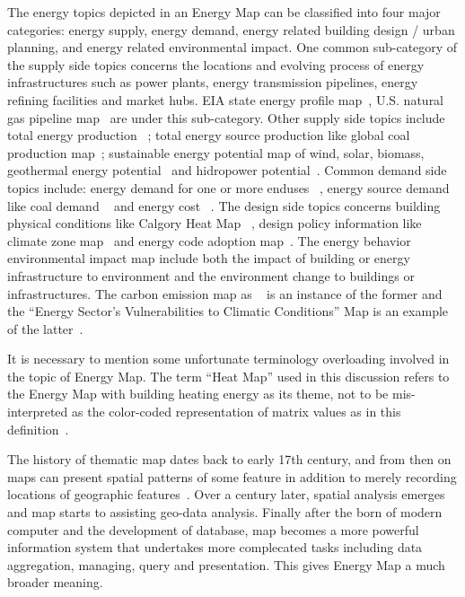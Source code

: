\documentclass[hidelinks,12pt]{article}
\begin{document}
The energy topics depicted in an Energy Map can be classified into
four major categories: energy supply, energy demand, energy related
building design / urban planning, and energy related environmental
impact. One common sub-category of the supply side topics concerns the
locations and evolving process of energy infrastructures such as power
plants, energy transmission pipelines, energy refining facilities and
market hubs. EIA state energy profile map~\cite{EIAProfile2015},
U.S. natural gas pipeline map~\cite{EIAGaspipe} are under this
sub-category. Other supply side topics include total energy production
~\cite{DOEEnergyProduct}; total energy source production like global
coal production map~\cite{EIACoalProduct}; sustainable energy
potential map of wind, solar, biomass, geothermal energy
potential~\cite{NRELMap2015} and hidropower
potential~\cite{DOEHydro}. Common demand side topics include: energy
demand for one or more enduses ~\cite{heatMap2012}, energy source
demand like coal demand ~\cite{EIACoalDemand} and energy cost
~\cite{DOEEnergyCost}. The design side topics concerns building
physical conditions like Calgory Heat Map ~\cite{Hay2011}, design
policy information like climate zone map~\cite{IECCClimate} and energy
code adoption map~\cite{CodeAdopt}. The energy behavior environmental
impact map include both the impact of building or energy
infrastructure to environment and the environment change to buildings
or infrastructures. The carbon emission map as ~\cite{CO2Atlas} is an
instance of the former and the ``Energy Sector's Vulnerabilities to
Climatic Conditions'' Map is an example of the
latter~\cite{DOEVulner}.

It is necessary to mention some unfortunate terminology overloading
involved in the topic of Energy Map. The term ``Heat Map'' used in
this discussion refers to the Energy Map with building heating energy
as its theme, not to be mis-interpreted as the color-coded
representation of matrix values as in this
definition~\cite{HeatmapWiki}.

The history of thematic map dates back to early 17th century, and from
then on maps can present spatial patterns of some feature in addition
to merely recording locations of geographic
features~\cite{ThematicMap}. Over a century later, spatial analysis
emerges and map starts to assisting geo-data analysis. Finally after
the born of modern computer and the development of database, map
becomes a more powerful information system that undertakes more
complecated tasks including data aggregation, managing, query and
presentation. This gives Energy Map a much broader meaning.
\end{document}
